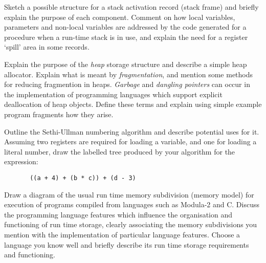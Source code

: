 \begin{questions}
\question

\begin{subquestions}

\subquestion
Sketch a possible structure for a stack activation
record (stack frame) and briefly explain the purpose of
each component. Comment on how local variables,
parameters and non-local variables
are addressed by the code generated for a
procedure when a run-time stack is in use,
and explain the need for a register `spill' area
in some records.

\subquestion
Explain the purpose of the {\em heap} storage structure and
describe a simple heap allocator.  Explain what is 
meant by {\em fragmentation}, and mention some methods
for reducing fragmention in heaps.  
{\em Garbage\/} and {\em dangling pointers}
can occur in the implementation of programming languages which
support explicit deallocation of heap objects. Define
these terms and explain using simple example program
fragments how they arise.

\subquestion
Outline the Sethi-Ullman numbering algorithm and
describe potential uses for it.  Assuming two registers
are required for loading a variable, and one for loading a literal number,
draw the labelled
tree produced by your algorithm for the expression:
\begin{verbatim}
       ((a + 4) + (b * c)) + (d - 3)
\end{verbatim}

\end{subquestions}

 
\question

\begin{subquestions}

\subquestion
Draw a diagram of the usual run time memory
subdivision (memory model) for execution of
programs compiled from languages such as
Modula-2 and C.  
Discuss the programming language features which influence
the organisation and functioning of run time storage,
clearly associating the memory subdivisions you 
mention with the implementation of particular language features.
Choose a language you know well and briefly describe
its run time storage requirements and functioning.


\end{subquestions}
\end{questions}

